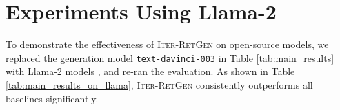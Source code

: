 \section{Experiments Using Llama-2}
\label{sec:llama}
To demonstrate the effectiveness of I\textsc{ter}-R\textsc{et}G\textsc{en} on open-source models, we replaced the generation model \texttt{text-davinci-003} in Table \ref{tab:main_results} with Llama-2 models \cite{DBLP:journals/corr/abs-2307-09288}, and re-ran the evaluation.
As shown in Table \ref{tab:main_results_on_llama}, I\textsc{ter}-R\textsc{et}G\textsc{en} consistently outperforms all baselines significantly.

\begingroup
\setlength{\tabcolsep}{3pt} %
\renewcommand{\arraystretch}{1} %
\begin{table}[t!]
    \centering
    \caption{
    Experiments using the open-source Llama-2 models.
    We used \texttt{Acc\textsuperscript{\dag}} as the evaluation metric, i.e., to evaluate the accuracy of model outputs with \texttt{text-davinci-003}.
    }
    \label{tab:main_results_on_llama}
\end{table}
\endgroup



